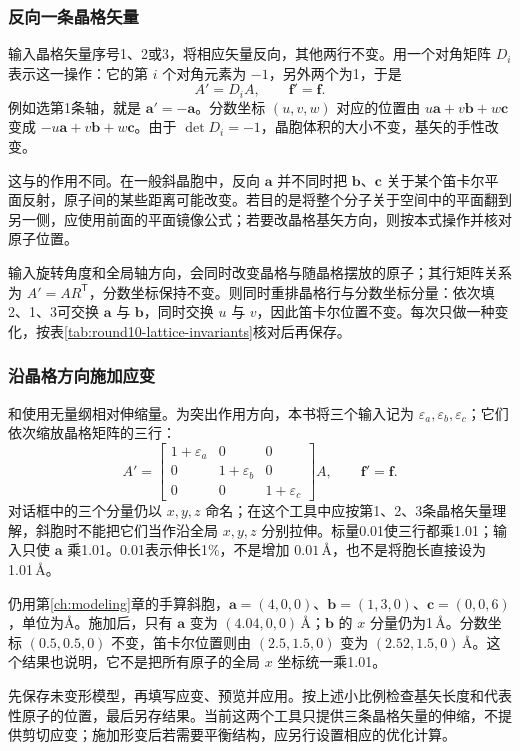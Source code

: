 \subsubsection{反向一条晶格矢量}

输入晶格矢量序号1、2或3，将相应矢量反向，其他两行不变。用一个对角矩阵 $D_i$ 表示这一操作：它的第 $i$ 个对角元素为 $-1$，另外两个为1，于是
\begin{equation}
 A'=D_iA,\qquad \mathbf f'=\mathbf f.
 \label{eq:mirror-lattice-row}
\end{equation}
例如选第1条轴，就是 $\mathbf a'=-\mathbf a$。分数坐标 $(u,v,w)$ 对应的位置由 $u\mathbf a+v\mathbf b+w\mathbf c$ 变成 $-u\mathbf a+v\mathbf b+w\mathbf c$。由于 $\det D_i=-1$，晶胞体积的大小不变，基矢的手性改变。

这与的作用不同。在一般斜晶胞中，反向 $\mathbf a$ 并不同时把 $\mathbf b$、$\mathbf c$ 关于某个笛卡尔平面反射，原子间的某些距离可能改变。若目的是将整个分子关于空间中的平面翻到另一侧，应使用前面的平面镜像公式；若要改晶格基矢方向，则按本式操作并核对原子位置。

输入旋转角度和全局轴方向，会同时改变晶格与随晶格摆放的原子；其行矩阵关系为 $A'=AR^{\mathsf T}$，分数坐标保持不变。则同时重排晶格行与分数坐标分量：依次填2、1、3可交换 $\mathbf a$ 与 $\mathbf b$，同时交换 $u$ 与 $v$，因此笛卡尔位置不变。每次只做一种变化，按表\ref{tab:round10-lattice-invariants}核对后再保存。

\subsubsection{沿晶格方向施加应变}

和使用无量纲相对伸缩量。为突出作用方向，本书将三个输入记为 $\varepsilon_a,\varepsilon_b,\varepsilon_c$；它们依次缩放晶格矩阵的三行：
\begin{equation}
 A'=\begin{bmatrix}
 1+\varepsilon_a&0&0\\
 0&1+\varepsilon_b&0\\
 0&0&1+\varepsilon_c
 \end{bmatrix}A,\qquad \mathbf f'=\mathbf f.
 \label{eq:lattice-axial-strain}
\end{equation}
对话框中的三个分量仍以 $x,y,z$ 命名；在这个工具中应按第1、2、3条晶格矢量理解，斜胞时不能把它们当作沿全局 $x,y,z$ 分别拉伸。标量0.01使三行都乘1.01；输入只使 $\mathbf a$ 乘1.01。0.01表示伸长1\%，不是增加 $0.01\,\text{\AA}$，也不是将胞长直接设为1.01\,\AA。

仍用第\ref{ch:modeling}章的手算斜胞，$\mathbf a=(4,0,0)$、$\mathbf b=(1,3,0)$、$\mathbf c=(0,0,6)$，单位为\AA。施加后，只有 $\mathbf a$ 变为 $(4.04,0,0)\,\text{\AA}$；$\mathbf b$ 的 $x$ 分量仍为1\,\AA。分数坐标 $(0.5,0.5,0)$ 不变，笛卡尔位置则由 $(2.5,1.5,0)$ 变为 $(2.52,1.5,0)\,\text{\AA}$。这个结果也说明，它不是把所有原子的全局 $x$ 坐标统一乘1.01。

先保存未变形模型，再填写应变、预览并应用。按上述小比例检查基矢长度和代表性原子的位置，最后另存结果。当前这两个工具只提供三条晶格矢量的伸缩，不提供剪切应变；施加形变后若需要平衡结构，应另行设置相应的优化计算。
